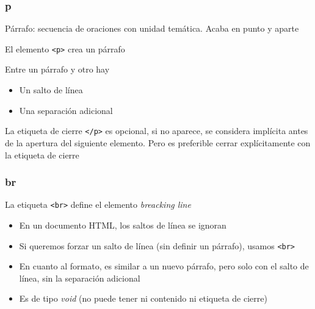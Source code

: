 \documentclass[ucs]{beamer}
\begin{document}
\begin{frame}[fragile]
\frametitle{p}

Párrafo: secuencia de oraciones con unidad temática. Acaba en punto y aparte

El elemento
\verb|<p>| crea un párrafo



Entre un párrafo y otro hay

    \begin{itemize}
    \item
Un salto de línea
    \item
Una separación adicional
    \end{itemize}


La etiqueta de cierre \verb|</p>| es opcional, si no aparece, 
se considera implícita antes de la apertura
del siguiente elemento.
Pero es preferible cerrar explícitamente con la etiqueta de cierre


\end{frame}



\begin{frame}[fragile]
\frametitle{br}
La etiqueta \verb|<br>| define el elemento \emph{breacking line}

\begin{itemize}
\item
En un documento HTML, los saltos de línea se ignoran
\item
Si queremos forzar un salto de línea (sin definir un párrafo), usamos \verb|<br>|
\item
En cuanto al formato, es similar a un nuevo párrafo, pero solo con el salto de línea,  sin la separación adicional
\item
Es de tipo \emph{void} (no puede tener ni contenido ni etiqueta de cierre)

\end{itemize}

\end{frame}
\end{document}
